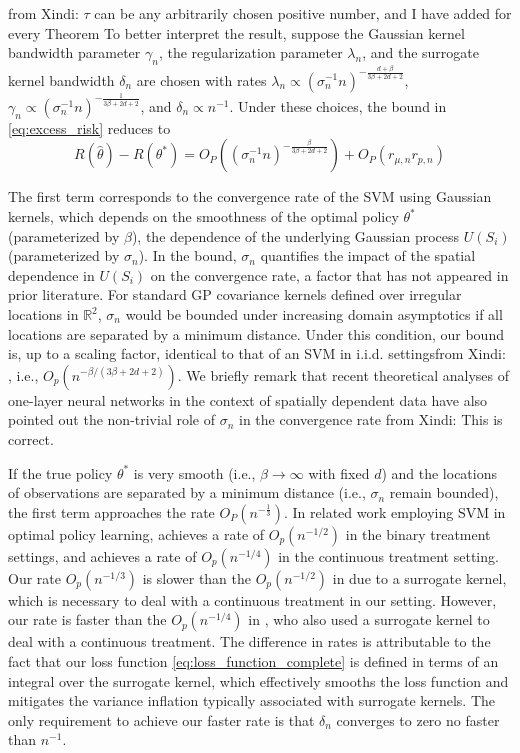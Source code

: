 \documentclass[12pt]{article}
\newcommand{\XL}[1]{{\color{blue}from Xindi: #1}}
\begin{document}
\XL{$\tau$ can be any arbitrarily chosen positive number, and I have added for every Theorem}
\noindent To better interpret the result, suppose the Gaussian kernel bandwidth parameter $\gamma_n$, the regularization parameter $\lambda_n$, and the surrogate kernel bandwidth $\delta_n$ are chosen with rates $\lambda_n \propto (\sigma_n^{-1}n)^{-\frac{d+\beta}{3\beta + 2d + 2}}$, $\gamma_n\propto (\sigma_n^{-1}n)^{-\frac{1}{3\beta + 2d + 2}}$, and $\delta_n\propto n^{-1}$. Under these choices, the bound in \eqref{eq:excess_risk} reduces to 
$$R(\widehat\theta)-R\left(\theta^*\right)=O_P\left((\sigma_n^{-1}n)^{-\frac{\beta}{3\beta + 2d + 2}}\right)+O_P(r_{\mu,n}r_{p,n} )$$

The first term corresponds to the convergence rate of the SVM using Gaussian kernels, which depends on the smoothness of the optimal policy $\theta^*$ (parameterized by $\beta$), the dependence of the underlying Gaussian process $U(S_i)$ (parameterized by $\sigma_n$). In the bound, $\sigma_n$ quantifies the impact of the spatial dependence in $U(S_i)$ on the convergence rate, a factor that has not appeared in prior literature. For standard GP covariance kernels defined over irregular locations in $\mathbb{R}^2$, $\sigma_n$ would be bounded under increasing domain asymptotics if all locations are separated by a minimum distance. Under this condition, our bound is, up to a scaling factor, identical to that of an SVM in i.i.d. settings\XL{, i.e., $O_p(n^{-\beta/(3\beta+2d+2)})$}. We briefly remark that recent theoretical analyses of one-layer neural networks in the context of spatially dependent data have also pointed out the non-trivial role of $\sigma_n$ in the convergence rate \citep{zhan2024neural} \XL{This is correct}.

If the true policy $\theta^*$ is very smooth (i.e., $\beta\rightarrow \infty$ with fixed $d$) and the locations of observations are separated by a minimum distance (i.e., $\sigma_n$ remain bounded), the first term approaches the rate $O_P(n^{-\frac{1}{3}})$. In related work employing SVM in optimal policy learning, \citet{park2024minimum} achieves a rate of $O_p(n^{-1/2})$ in the binary treatment settings, and \citet{chen2016personalized} achieves a rate of $O_p(n^{-1/4})$ in the continuous treatment setting. Our rate $O_p(n^{-1/3})$ is slower than the $O_p(n^{-1/2})$ in \citet{park2024minimum} due to a surrogate kernel, which is necessary to deal with a continuous treatment in our setting. However, our rate is faster than the $O_p(n^{-1/4})$ in \citet{chen2016personalized}, who also used a surrogate kernel to deal with a continuous treatment. The difference in rates is attributable to the fact that our loss function \eqref{eq:loss_function_complete} is defined in terms of an integral over the surrogate kernel, which effectively smooths the loss function and mitigates the variance inflation typically associated with surrogate kernels. The only requirement to achieve our faster rate is that $\delta_n$ converges to zero no faster than $n^{-1}$. 
\end{document}

